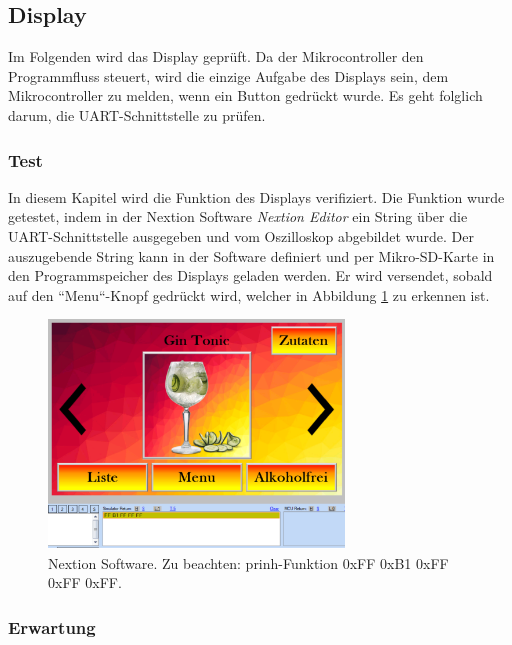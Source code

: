\subsection{Display}
\label{subsec:Hardware_Display}

Im Folgenden wird das Display geprüft. Da der Mikrocontroller den Programmfluss steuert, wird die einzige Aufgabe des Displays sein, dem Mikrocontroller zu melden, wenn ein Button gedrückt wurde. Es geht folglich darum, die UART-Schnittstelle zu prüfen.

\subsubsection{Test}\label{subsubsec:Display_Test}

In diesem Kapitel wird die Funktion des Displays verifiziert. Die Funktion wurde getestet, indem in der Nextion Software \textit{Nextion Editor} ein String über die UART-Schnittstelle ausgegeben und vom Oszilloskop abgebildet wurde. Der auszugebende String kann in der Software definiert und per Mikro-SD-Karte in den Programmspeicher des Displays geladen werden. Er wird versendet, sobald auf den ``Menu``-Knopf gedrückt wird, welcher in Abbildung \ref{fig:Hardware_Nextion_Display_0} zu erkennen ist.

\begin{figure}[h!]
	\centering
	\includegraphics[width=0.7\textwidth]{graphics/Display_Hardware_Nextion_HMI.png}
	\caption{Nextion Software. Zu beachten: prinh-Funktion 0xFF 0xB1 0xFF 0xFF 0xFF.} 
	\label{fig:Hardware_Nextion_Display_0}
\end{figure}

\subsubsection{Erwartung}\label{subsubsec:Hardware_Display_Erwartung}

